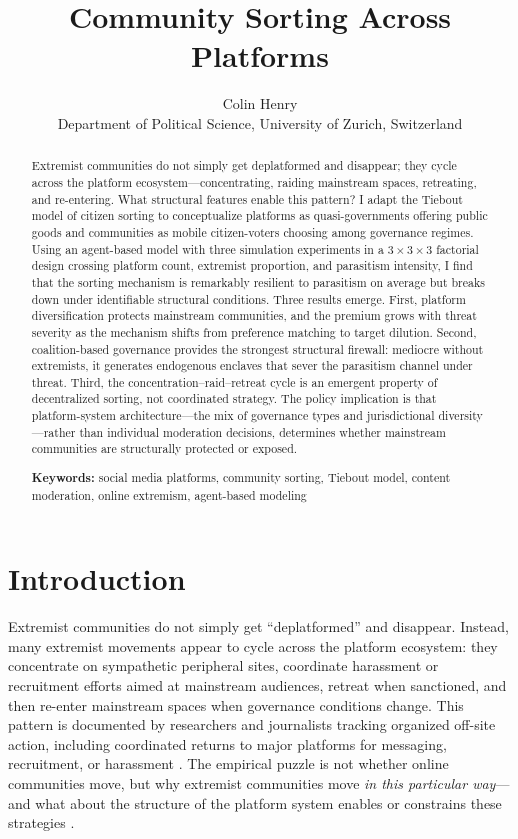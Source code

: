\documentclass{article}
\title{Community Sorting Across Platforms}
\author{Colin Henry \\
  Department of Political Science, University of Zurich, Switzerland}
\date{}
\begin{document}
\maketitle

\begin{abstract}
Extremist communities do not simply get deplatformed and disappear; they cycle across the platform ecosystem---concentrating, raiding mainstream spaces, retreating, and re-entering. What structural features enable this pattern? I adapt the Tiebout model of citizen sorting to conceptualize platforms as quasi-governments offering public goods and communities as mobile citizen-voters choosing among governance regimes. Using an agent-based model with three simulation experiments in a $3 \times 3 \times 3$ factorial design crossing platform count, extremist proportion, and parasitism intensity, I find that the sorting mechanism is remarkably resilient to parasitism on average but breaks down under identifiable structural conditions. Three results emerge. First, platform diversification protects mainstream communities, and the premium grows with threat severity as the mechanism shifts from preference matching to target dilution. Second, coalition-based governance provides the strongest structural firewall: mediocre without extremists, it generates endogenous enclaves that sever the parasitism channel under threat. Third, the concentration--raid--retreat cycle is an emergent property of decentralized sorting, not coordinated strategy. The policy implication is that platform-system architecture---the mix of governance types and jurisdictional diversity---rather than individual moderation decisions, determines whether mainstream communities are structurally protected or exposed.

\textbf{Keywords:} social media platforms, community sorting, Tiebout model, content moderation, online extremism, agent-based modeling
\end{abstract}

\section{Introduction}

Extremist communities do not simply get ``deplatformed'' and disappear. Instead, many extremist movements appear to cycle across the platform ecosystem: they concentrate on sympathetic peripheral sites, coordinate harassment or recruitment efforts aimed at mainstream audiences, retreat when sanctioned, and then re-enter mainstream spaces when governance conditions change. This pattern is documented by researchers and journalists tracking organized off-site action, including coordinated returns to major platforms for messaging, recruitment, or harassment \citep{lavin2020culture, gais2021encrypted}. The empirical puzzle is not whether online communities move, but why extremist communities move \emph{in this particular way}---and what about the structure of the platform system enables or constrains these strategies \citep{dehghan2022politicization}.
\end{document}
